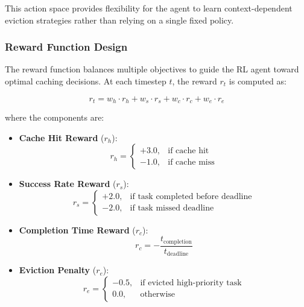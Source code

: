 This action space provides flexibility for the agent to learn context-dependent eviction strategies rather than relying on a single fixed policy.

\subsubsection{Reward Function Design}

The reward function balances multiple objectives to guide the RL agent toward optimal caching decisions. At each timestep $t$, the reward $r_t$ is computed as:

\begin{equation}
r_t = w_h \cdot r_h + w_s \cdot r_s + w_c \cdot r_c + w_e \cdot r_e
\end{equation}

where the components are:

\begin{itemize}
    \item \textbf{Cache Hit Reward} ($r_h$): 
    \begin{equation}
        r_h = \begin{cases}
            +3.0, & \text{if cache hit} \\
            -1.0, & \text{if cache miss}
        \end{cases}
    \end{equation}
    
    \item \textbf{Success Rate Reward} ($r_s$):
    \begin{equation}
        r_s = \begin{cases}
            +2.0, & \text{if task completed before deadline} \\
            -2.0, & \text{if task missed deadline}
        \end{cases}
    \end{equation}
    
    \item \textbf{Completion Time Reward} ($r_c$):
    \begin{equation}
        r_c = -\frac{t_{\text{completion}}}{t_{\text{deadline}}}
    \end{equation}
    
    \item \textbf{Eviction Penalty} ($r_e$):
    \begin{equation}
        r_e = \begin{cases}
            -0.5, & \text{if evicted high-priority task} \\
            0.0, & \text{otherwise}
        \end{cases}
    \end{equation}
\end{itemize}

